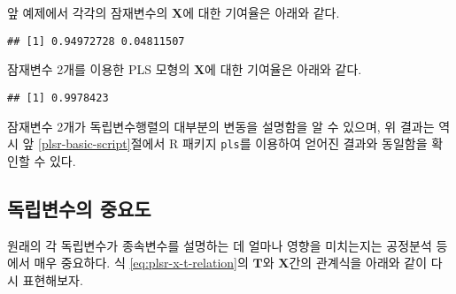 \documentclass[
]{book}
\newenvironment{Shaded}{\begin{snugshade}}{\end{snugshade}}
\newcommand{\FunctionTok}[1]{\textcolor[rgb]{0.00,0.00,0.00}{#1}}
\newcommand{\NormalTok}[1]{#1}
\newcommand{\SpecialCharTok}[1]{\textcolor[rgb]{0.00,0.00,0.00}{#1}}
\begin{document}
앞 예제에서 각각의 잠재변수의 \(\mathbf{X}\)에 대한 기여율은 아래와 같다.

\begin{Shaded}
\end{Shaded}

\begin{verbatim}
## [1] 0.94972728 0.04811507
\end{verbatim}

잠재변수 2개를 이용한 PLS 모형의 \(\mathbf{X}\)에 대한 기여율은 아래와 같다.

\begin{Shaded}
\end{Shaded}

\begin{verbatim}
## [1] 0.9978423
\end{verbatim}

잠재변수 2개가 독립변수행렬의 대부분의 변동을 설명함을 알 수 있으며, 위 결과는 역시 앞 \ref{plsr-basic-script}절에서 R 패키지 \texttt{pls}를 이용하여 얻어진 결과와 동일함을 확인할 수 있다.

\hypertarget{plsr-variable-importance}{%
\subsection{독립변수의 중요도}\label{plsr-variable-importance}}

원래의 각 독립변수가 종속변수를 설명하는 데 얼마나 영향을 미치는지는 공정분석 등에서 매우 중요하다. 식 \eqref{eq:plsr-x-t-relation}의 \(\mathbf{T}\)와 \(\mathbf{X}\)간의 관계식을 아래와 같이 다시 표현해보자.
\end{document}
